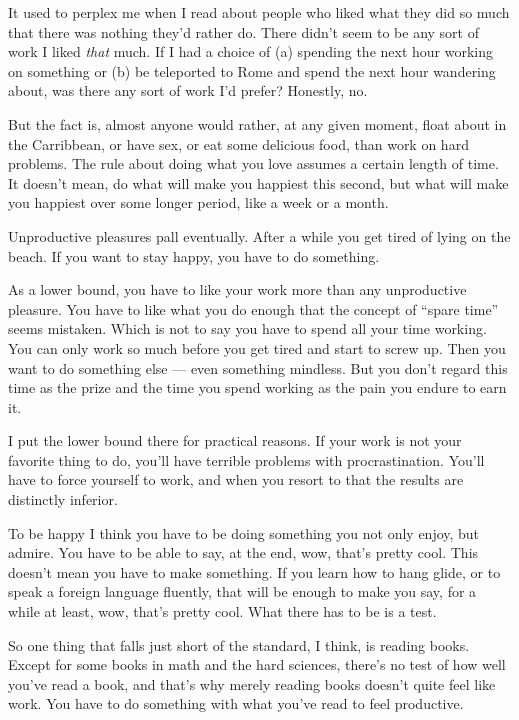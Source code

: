 It used to perplex me when I read about people who liked what they did
so much that there was nothing they'd rather do. There didn't seem to be
any sort of work I liked \emph{that} much. If I had a choice of (a)
spending the next hour working on something or (b) be teleported to Rome
and spend the next hour wandering about, was there any sort of work I'd
prefer? Honestly, no.

But the fact is, almost anyone would rather, at any given moment, float
about in the Carribbean, or have sex, or eat some delicious food, than
work on hard problems. The rule about doing what you love assumes a
certain length of time. It doesn't mean, do what will make you happiest
this second, but what will make you happiest over some longer period,
like a week or a month.

Unproductive pleasures pall eventually. After a while you get tired of
lying on the beach. If you want to stay happy, you have to do something.

As a lower bound, you have to like your work more than any unproductive
pleasure. You have to like what you do enough that the concept of
``spare time'' seems mistaken. Which is not to say you have to spend all
your time working. You can only work so much before you get tired and
start to screw up. Then you want to do something else --- even something
mindless. But you don't regard this time as the prize and the time you
spend working as the pain you endure to earn it.

I put the lower bound there for practical reasons. If your work is not
your favorite thing to do, you'll have terrible problems with
procrastination. You'll have to force yourself to work, and when you
resort to that the results are distinctly inferior.

To be happy I think you have to be doing something you not only enjoy,
but admire. You have to be able to say, at the end, wow, that's pretty
cool. This doesn't mean you have to make something. If you learn how to
hang glide, or to speak a foreign language fluently, that will be enough
to make you say, for a while at least, wow, that's pretty cool. What
there has to be is a test.

So one thing that falls just short of the standard, I think, is reading
books. Except for some books in math and the hard sciences, there's no
test of how well you've read a book, and that's why merely reading books
doesn't quite feel like work. You have to do something with what you've
read to feel productive.

